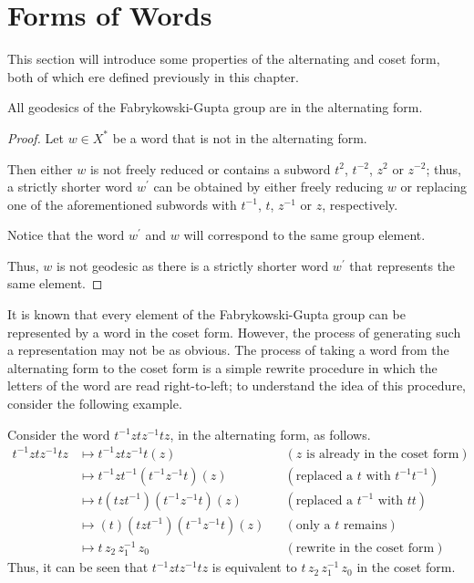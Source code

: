 \section{Forms of Words}

This section will introduce some properties of the alternating and coset form, both of which ere defined previously in this chapter.

\begin{proposition}
	\label{prop:geodesics-in-alt-form}
	All geodesics of the Fabrykowski-Gupta group are in the alternating form.
\end{proposition}

\begin{proof} Let $w\in X^*$ be a word that is not in the alternating form.
	
	Then either $w$ is not freely reduced or contains a subword $t^2$, $t^{-2}$, $z^2$ or $z^{-2}$;
	thus, a strictly shorter word $w^\prime$ can be obtained by either freely reducing $w$ or replacing one of the aforementioned subwords with $t^{-1}$, $t$, $z^{-1}$ or $z$, respectively. 
	
	Notice that the word $w^\prime$ and $w$  will correspond to the same group element.
	
	Thus, $w$ is not geodesic as there is a strictly shorter word $w^\prime$ that represents the same element.
\end{proof}

It is known that every element of the Fabrykowski-Gupta group can be represented by a word in the coset form.
However, the process of generating such a representation may not be as obvious.
The process of taking a word from the alternating form to the coset form is a simple rewrite procedure in which the letters of the word are read right-to-left; to understand the idea of this procedure, consider the following example.

\begin{example}
	Consider the word $t^{-1} z t z^{-1} t z$, in the alternating form, as follows.
	\begin{align*}
	  t^{-1} z t z^{-1} t z
	  &\mapsto t^{-1} z t z^{-1} t \left(z\right)
	   &&\left(z\text{ is already in the coset form}\right)
	   \\
	  &\mapsto t^{-1} z t^{-1} \left( t^{-1}  z^{-1} t\right) \left(z\right)
	   &&\left(\text{replaced a }t\text{ with }t^{-1}t^{-1}\right)
	   \\
	  &\mapsto t \left(t z t^{-1}\right) \left( t^{-1}  z^{-1} t\right) \left(z\right)
	   &&\left(\text{replaced a }t^{-1}\text{ with }tt\right)
	   \\
	  &\mapsto \left(t\right) \left(t z t^{-1}\right) \left( t^{-1}  z^{-1} t\right) \left(z\right)
	   &&\left(\text{only a }t\text{ remains}\right)
	   \\
	  &\mapsto t \, z_2 \, z_1^{-1} \, z_0
	   &&\left(\text{rewrite in the coset form}\right)
	\end{align*}
	Thus, it can be seen that $t^{-1} z t z^{-1} t z$ is equivalent to $t \, z_2 \, z_1^{-1} \, z_0$ in the coset form.
	\thmendmark
\end{example}

